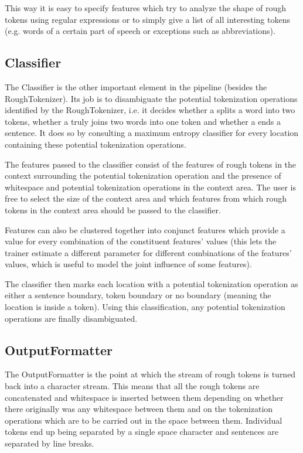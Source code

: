 This way it is easy to specify features which try to analyze the shape
of rough tokens using regular expressions or to simply give a list of
all interesting tokens (e.g. words of a certain part of speech or
exceptions such as abbreviations).

\subsection{Classifier}

The Classifier is the other important element in the pipeline (besides
the RoughTokenizer). Its job is to disambiguate the potential
tokenization operations identified by the RoughTokenizer, i.e. it
decides whether a \maysplit{} splits a word into two tokens, whether a
\mayjoin{} truly joins two words into one token and whether a
\maybreaksentence{} ends a sentence. It does so by consulting a
maximum entropy classifier for every location containing these
potential tokenization operations.

The features passed to the classifier consist of the features of rough
tokens in the context surrounding the potential tokenization operation
and the presence of whitespace and potential tokenization operations
in the context area. The user is free to select the size of the
context area and which features from which rough tokens in the context
area should be passed to the classifier.

Features can also be clustered together into conjunct features which
provide a value for every combination of the constituent features'
values (this lets the trainer estimate a different parameter for
different combinations of the features' values, which is useful to
model the joint influence of some features).

The classifier then marks each location with a potential tokenization
operation as either a sentence boundary, token boundary or no boundary
(meaning the location is inside a token). Using this classification,
any potential tokenization operations are finally disambiguated.

\subsection{OutputFormatter}

The OutputFormatter is the point at which the stream of rough tokens
is turned back into a character stream. This means that all the rough
tokens are concatenated and whitespace is inserted between them
depending on whether there originally was any whitespace between them
and on the tokenization operations which are to be carried out in the
space between them. Individual tokens end up being separated by a
single space character and sentences are separated by line breaks.
